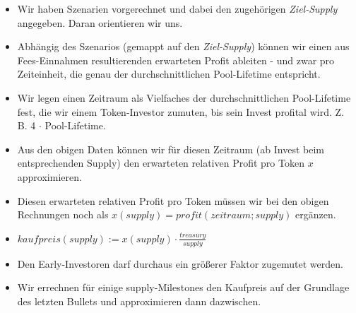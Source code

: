 \begin{Algo}

\begin{itemize}
	\item Wir haben Szenarien vorgerechnet und dabei den zugehörigen \textit{Ziel-Supply} angegeben. Daran orientieren wir uns.
	\item Abhängig des Szenarios (gemappt auf den \textit{Ziel-Supply}) können wir einen aus Fees-Einnahmen resultierenden erwarteten Profit ableiten - und zwar pro Zeiteinheit, die genau der durchschnittlichen Pool-Lifetime entspricht.
	\item Wir legen einen Zeitraum als Vielfaches der durchschnittlichen Pool-Lifetime fest, die wir einem Token-Investor zumuten, bis sein Invest profital wird. Z. B. 4 $\cdot$ Pool-Lifetime.
	\item Aus den obigen Daten können wir für diesen Zeitraum (ab Invest beim entsprechenden Supply) den erwarteten relativen Profit pro Token $x$ approximieren.
	\item Diesen erwarteten relativen Profit pro Token müssen wir bei den obigen Rechnungen noch als $x(supply) = profit(zeitraum; supply)$ ergänzen.
	\item $kaufpreis(supply) := x(supply) \cdot \frac{treasury}{supply}$
	\item Den Early-Investoren darf durchaus ein größerer Faktor zugemutet werden.
	\item Wir errechnen für einige supply-Milestones den Kaufpreis auf der Grundlage des letzten Bullets und approximieren dann dazwischen.
\end{itemize}

\end{Algo}



\vspace{1.0cm}


\vspace{0.3cm}

